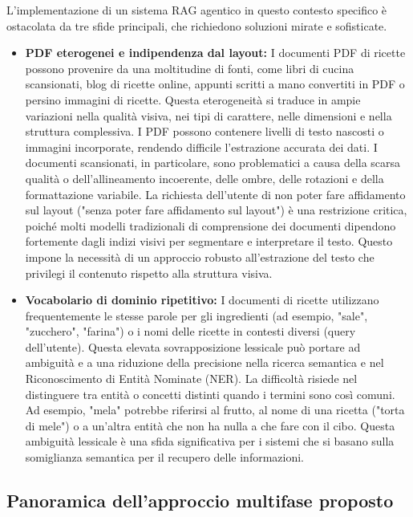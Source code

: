 \documentclass[a4paper, 11pt]{article}
\begin{document}
L'implementazione di un sistema RAG agentico in questo contesto specifico è ostacolata da tre sfide principali, che richiedono soluzioni mirate e sofisticate.
\begin{itemize}
    \item \textbf{PDF eterogenei e indipendenza dal layout:} I documenti PDF di ricette possono provenire da una moltitudine di fonti, come libri di cucina scansionati, blog di ricette online, appunti scritti a mano convertiti in PDF o persino immagini di ricette. Questa eterogeneità si traduce in ampie variazioni nella qualità visiva, nei tipi di carattere, nelle dimensioni e nella struttura complessiva. \cite{ocr_best_practices} I PDF possono contenere livelli di testo nascosti o immagini incorporate, rendendo difficile l'estrazione accurata dei dati. \cite{algodocs_challenges} I documenti scansionati, in particolare, sono problematici a causa della scarsa qualità o dell'allineamento incoerente, delle ombre, delle rotazioni e della formattazione variabile. \cite{algodocs_challenges} La richiesta dell'utente di non poter fare affidamento sul layout ("senza poter fare affidamento sul layout") è una restrizione critica, poiché molti modelli tradizionali di comprensione dei documenti dipendono fortemente dagli indizi visivi per segmentare e interpretare il testo. \cite{amazon_science_heterogenous} Questo impone la necessità di un approccio robusto all'estrazione del testo che privilegi il contenuto rispetto alla struttura visiva.
    \item \textbf{Vocabolario di dominio ripetitivo:} I documenti di ricette utilizzano frequentemente le stesse parole per gli ingredienti (ad esempio, "sale", "zucchero", "farina") o i nomi delle ricette in contesti diversi (query dell'utente). Questa elevata sovrapposizione lessicale può portare ad ambiguità e a una riduzione della precisione nella ricerca semantica e nel Riconoscimento di Entità Nominate (NER). La difficoltà risiede nel distinguere tra entità o concetti distinti quando i termini sono così comuni. Ad esempio, "mela" potrebbe riferirsi al frutto, al nome di una ricetta ("torta di mele") o a un'altra entità che non ha nulla a che fare con il cibo. Questa ambiguità lessicale è una sfida significativa per i sistemi che si basano sulla somiglianza semantica per il recupero delle informazioni. \cite{nlp_challenges}
\end{itemize}

\subsection{Panoramica dell'approccio multifase proposto}
\end{document}
